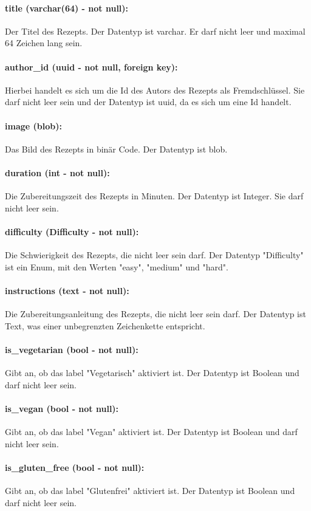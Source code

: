\documentclass{entwurfsheft}
\begin{document}
\paragraph{title (varchar(64) - not null):} Der Titel des Rezepts. Der Datentyp ist \Gls{varchar}. Er darf nicht leer und maximal 64 Zeichen lang sein.
\paragraph{author\_id (uuid - not null, foreign key):} Hierbei handelt es sich um die Id des Autors des Rezepts als Fremdschlüssel. Sie darf nicht leer sein und der Datentyp ist \Gls{uuid}, da es sich um eine Id handelt.
\paragraph{image (blob):} Das Bild des Rezepts in binär Code. Der Datentyp ist \Gls{blob}.
\paragraph{duration (int - not null):} Die Zubereitungszeit des Rezepts in Minuten. Der Datentyp ist Integer. Sie darf nicht leer sein.
\paragraph{difficulty (Difficulty - not null):} Die Schwierigkeit des Rezepts, die nicht leer sein darf. Der Datentyp "Difficulty" ist ein Enum, mit den Werten "easy", "medium" und "hard".
\paragraph{instructions (text - not null):} Die Zubereitungsanleitung des Rezepts, die nicht leer sein darf. Der Datentyp ist Text, was einer unbegrenzten Zeichenkette entspricht.
\paragraph{is\_vegetarian (bool - not null):} Gibt an, ob das \Gls{label} "Vegetarisch" aktiviert ist. Der Datentyp ist Boolean und darf nicht leer sein.
\paragraph{is\_vegan (bool - not null):} Gibt an, ob das \Gls{label} "Vegan" aktiviert ist. Der Datentyp ist Boolean und darf nicht leer sein.
\paragraph{is\_gluten\_free (bool - not null):} Gibt an, ob das \Gls{label} "Glutenfrei" aktiviert ist. Der Datentyp ist Boolean und darf nicht leer sein.
\end{document}
